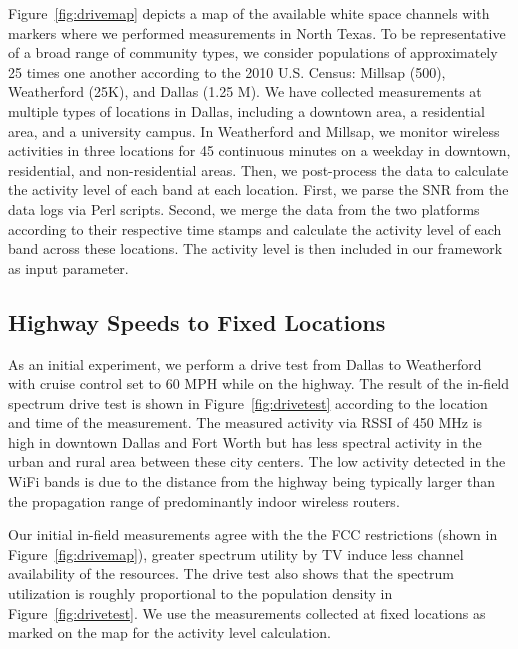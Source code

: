 Figure~\ref{fig:drivemap} depicts a map of the available white space channels with markers where we performed 
measurements in North Texas. To be representative of a broad range of community types, we consider populations of 
approximately 25 times one another according to the 2010 U.S. Census: Millsap (500), Weatherford (25K), and Dallas 
(1.25 M). We have collected measurements at multiple types of locations in Dallas, including a downtown area,
a residential area, and a university campus. In Weatherford and Millsap, we monitor wireless activities in three 
locations for 45 continuous minutes on a weekday in downtown, residential, and non-residential areas. Then, we 
post-process the data to calculate the activity level of each band at each location. First, we parse the SNR from 
the data logs via Perl scripts. Second, we merge the data from the two platforms according to their respective 
time stamps and calculate the activity level of each band across these locations. The activity level is then 
included in our framework as input parameter. 

\subsection{Highway Speeds to Fixed Locations} 
\label{subsec:measurementresult}
As an initial experiment, we perform a drive test from Dallas to Weatherford with cruise control set to 60 MPH while 
on the highway. The result of the in-field spectrum drive test is shown in Figure~\ref{fig:drivetest} according to 
the location and time of the measurement. The measured activity via RSSI of 450 MHz is high in downtown Dallas and 
Fort Worth but has less spectral activity in the urban and rural area between these city centers. The low activity 
detected in the WiFi bands is due to the distance from the highway being typically larger than the propagation range 
of predominantly indoor wireless routers.

Our initial in-field measurements agree with the the FCC restrictions (shown in Figure~\ref{fig:drivemap}), 
greater spectrum utility by TV induce less channel availability of the resources.
The drive test also shows that the spectrum 
utilization is roughly proportional to the population density in Figure~\ref{fig:drivetest}. We use the measurements 
collected at fixed locations as marked on the map for the activity level calculation. 

